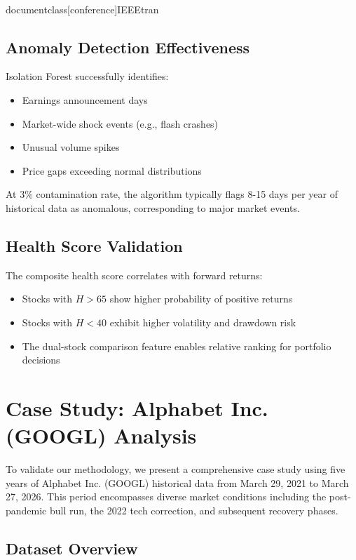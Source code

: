 \\documentclass[conference]{IEEEtran}
\begin{document}
\subsection{Anomaly Detection Effectiveness}
Isolation Forest successfully identifies:
\begin{itemize}
    \item Earnings announcement days
    \item Market-wide shock events (e.g., flash crashes)
    \item Unusual volume spikes
    \item Price gaps exceeding normal distributions
\end{itemize}

At 3\% contamination rate, the algorithm typically flags 8-15 days per year of historical data as anomalous, corresponding to major market events.

\subsection{Health Score Validation}
The composite health score correlates with forward returns:
\begin{itemize}
    \item Stocks with $H > 65$ show higher probability of positive returns
    \item Stocks with $H < 40$ exhibit higher volatility and drawdown risk
    \item The dual-stock comparison feature enables relative ranking for portfolio decisions
\end{itemize}

\section{Case Study: Alphabet Inc. (GOOGL) Analysis}

To validate our methodology, we present a comprehensive case study using five years of Alphabet Inc. (GOOGL) historical data from March 29, 2021 to March 27, 2026. This period encompasses diverse market conditions including the post-pandemic bull run, the 2022 tech correction, and subsequent recovery phases.

\subsection{Dataset Overview}
\end{document}
